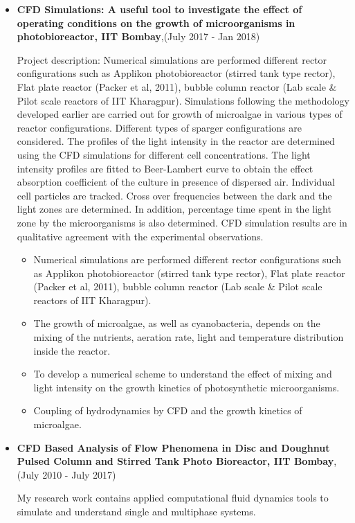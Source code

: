 \documentclass[a4paper,12pt]{article}
\begin{document}
\begin{itemize}
\item \textbf{CFD Simulations: A useful tool to investigate the effect of operating conditions on the growth of microorganisms in photobioreactor, IIT Bombay},(July 2017 - Jan 2018)

{Project description: Numerical simulations are performed different rector configurations such as Applikon photobioreactor (stirred tank type rector), Flat plate reactor (Packer et al, 2011), bubble column reactor (Lab scale \& Pilot scale reactors of IIT Kharagpur). Simulations following the methodology developed earlier are carried out for growth of microalgae in various types of reactor configurations. Different types of sparger configurations are considered. The profiles of the light intensity in the reactor are determined using the CFD simulations for different cell concentrations. The light intensity profiles are fitted to Beer-Lambert curve to obtain the effect absorption coefficient of the culture in presence of dispersed air. Individual cell particles are tracked. Cross over frequencies between the dark and the light zones are determined. In addition, percentage time spent in the light zone by the microorganisms is also determined. CFD simulation results are in qualitative agreement with the experimental observations.}
\begin{itemize}
  \item Numerical simulations are performed different rector configurations such as Applikon photobioreactor (stirred tank type rector), Flat plate reactor (Packer et al, 2011), bubble column reactor (Lab scale \& Pilot scale reactors of IIT Kharagpur).
  \item The growth of microalgae, as well as cyanobacteria, depends on the mixing of the nutrients, aeration rate, light and temperature distribution inside the reactor.
  \item To develop a numerical scheme to understand the effect of mixing and light intensity on the growth kinetics of photosynthetic microorganisms.
  \item Coupling of hydrodynamics by CFD and the growth kinetics of microalgae.
\end{itemize}

\item \textbf{CFD Based Analysis of Flow Phenomena in Disc and Doughnut Pulsed Column and Stirred Tank Photo Bioreactor, IIT Bombay},(July 2010 - July 2017)

{My research work contains applied computational fluid dynamics tools to simulate and understand single and multiphase systems.}


\end{itemize}
\end{document}
